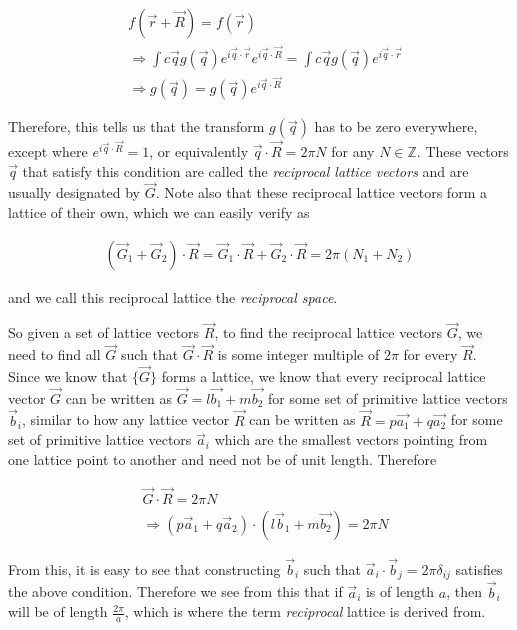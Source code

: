 \begin{align}
  &f(\vec{r}+\vec{R})=f(\vec{r}) \\
  &\Rightarrow\int c\vec{q}g(\vec{q})e^{i\vec{q}\cdot\vec{r}}e^{i\vec{q}\cdot\vec{R}}=\int c\vec{q}g(\vec{q})e^{i\vec{q}\cdot\vec{r}} \\
  &\Rightarrow g(\vec{q})=g(\vec{q})e^{i\vec{q}\cdot\vec{R}}
\end{align}

Therefore, this tells us that the transform $g(\vec{q})$ has to be zero
everywhere, except where $e^{i\vec{q}\cdot\vec{R}}=1$, or equivalently
$\vec{q}\cdot\vec{R}=2\pi N$ for any $N\in \mathbb{Z}$. These vectors $\vec{q}$ that
satisfy this condition are called the \textit{reciprocal lattice vectors} and
are usually designated by $\vec{G}$. Note also that these reciprocal lattice
vectors form a lattice of their own, which we can easily verify as

\begin{align}
(\vec{G}_1+\vec{G}_2)\cdot\vec{R}=\vec{G}_1\cdot\vec{R}+\vec{G}_2\cdot\vec{R}=2\pi (N_1+N_2)
\end{align}
 
and we call this reciprocal lattice the \textit{reciprocal space}.

So given a set of lattice vectors $\vec{R}$, to find the reciprocal lattice
vectors $\vec{G}$, we need to find all $\vec{G}$ such that
$\vec{G}\cdot\vec{R}$ is some integer multiple of $2\pi$ for every $\vec{R}$.
Since we know that $\{\vec{G}\}$ forms a lattice, we know that every reciprocal
lattice vector $\vec{G}$ can be written as $\vec{G}=l\vec{b_1}+m\vec{b_2}$ for
some set of primitive lattice vectors $\vec{b}_i$, similar to how any lattice
vector $\vec{R}$ can be written as $\vec{R}=p\vec{a_1}+q\vec{a_2}$ for some set
of primitive lattice vectors $\vec{a}_i$ which are the smallest vectors
pointing from one lattice point to another and need not be of unit length.
Therefore 

\begin{align}
  &\vec{G}\cdot\vec{R}=2\pi N \\
  &\Rightarrow (p\vec{a}_1+q\vec{a}_2)\cdot(l\vec{b}_1+m\vec{b_2})=2\pi N
\end{align}

From this, it is easy to see that constructing $\vec{b}_i$ such that
$\vec{a}_i\cdot\vec{b}_j=2\pi\delta_{ij}$ satisfies the above condition.
Therefore we see from this that if $\vec{a}_i$ is of length $a$, then
$\vec{b}_i$ will be of length $\frac{2\pi}{a}$, which is where the term
\textit{reciprocal} lattice is derived from.

